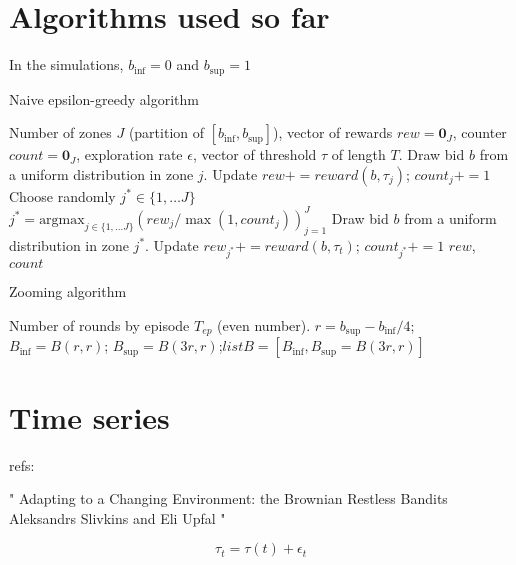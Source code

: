\documentclass[11pt]{article}
\begin{document}

\section{Algorithms used so far}

In the simulations, $b_{\inf} = 0$ and $b_{\sup} = 1$

\begin{algorithm}[H]
  \caption{Naive epsilon-greedy algorithm}
  \label{code:epsilon_greedy}
  \begin{algorithmic}[0]
  \Require Number of zones $J$ (partition of $[b_{\inf}, b_{\sup}]$), vector of rewards $rew = \mathbf{0}_J$, counter $count = \mathbf{0}_J$, exploration rate $\epsilon$,
  vector of threshold $\tau$ of length $T$.
   
  \State Draw bid $b$ from a uniform distribution in zone $j$.
  \State Update $rew += reward(b, \tau_j)$; $count_j += 1$
  \EndFor
   
  \State Choose randomly $j^* \in \{1, \dots J\}$
  \Else {}
  \State $j^* = \text{argmax}_{j \in \{1, \dots J\}} (rew_j / \max(1, count_j))_{j=1}^J$
  \EndIf
  \State Draw bid $b$ from a uniform distribution in zone $j^*$.
  \State Update $rew_{j^*} += reward(b, \tau_t)$; $count_{j^*} += 1$
  \EndFor
  \State \Return $rew$, $count$
\end{algorithmic}
\end{algorithm}

\begin{algorithm}[H]
  \caption{Zooming algorithm}
  \label{code:zoom}
  \begin{algorithmic}[0]
  \Require Number of rounds by episode $T_{ep}$ (even number).
  \State $r = b_{\sup} - b_{\inf}/4$; $B_{\inf} = B(r, r)$; $B_{\sup} = B(3r, r)$;$listB = [B_{\inf}, B_{\sup} = B(3r, r)]$ 

\end{algorithmic}
\end{algorithm}



\section{Time series}
refs:

"
Adapting to a Changing Environment: the Brownian Restless Bandits
Aleksandrs Slivkins
and Eli Upfal
"

$$\tau_t = \tau(t) + \epsilon_t$$ 
\newpage
%
\end{document}
